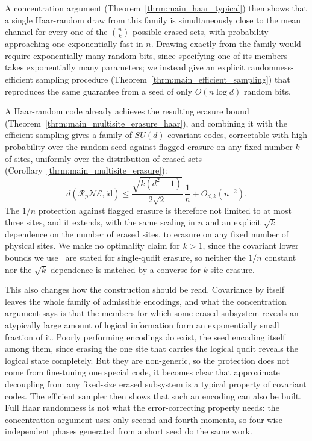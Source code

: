 \documentclass[10pt,twocolumn,superscriptaddress,aps,amsmath,amssymb,citeautoscript,floatfix,prx]{revtex4-2}
\theoremstyle{plain}
\theoremstyle{plain}
\theoremstyle{plain}
\theoremstyle{plain}
\theoremstyle{plain}
\theoremstyle{plain}
\theoremstyle{plain}
\theoremstyle{definition}
\theoremstyle{plain}
\begin{document}
A concentration argument (Theorem~\ref{thrm:main_haar_typical}) then shows that a single Haar-random draw from this family is
simultaneously close to the mean channel for every one of the $\binom nk$ possible erased sets, with probability approaching one exponentially fast in $n$. 
Drawing exactly from the family would require exponentially many random bits, since specifying one of its members takes exponentially many parameters; 
we instead give an explicit randomness-efficient sampling procedure (Theorem~\ref{thrm:main_efficient_sampling}) that reproduces the same guarantee from a seed of only $O(n\log d)$ random bits.

A Haar-random code already achieves the resulting erasure bound (Theorem~\ref{thrm:main_multisite_erasure_haar}), and combining it with the efficient sampling gives 
a family of $SU(d)$-covariant codes, correctable with high probability over the random seed against flagged erasure on any fixed number $k$ of sites, uniformly over the distribution of erased sets 
(Corollary~\ref{thrm:main_multisite_erasure}):
$$
d(\mathcal R_p\mathcal N\mathcal E,\mathrm{id})\le \frac{\sqrt{k(d^2-1)}}{2\sqrt2}\,\frac1n+O_{d,k}(n^{-2}).
$$
The $1/n$ protection against flagged erasure is therefore not limited to at most three sites, and it extends, with the same scaling in $n$ and an explicit $\sqrt k$ dependence on the number of erased sites, to erasure on any fixed number of physical sites. We make no optimality claim for $k>1$, 
since the covariant lower bounds we use~\cite{Faist2020,Zhou2021} are stated for single-qudit erasure, so neither the $1/n$ constant nor the $\sqrt k$ dependence is matched by a converse for $k$-site erasure.

This also changes how the construction should be read. Covariance by itself leaves the whole family of admissible encodings, and what the concentration argument says is that the members for which some erased subsystem reveals an atypically large amount of 
logical information form an exponentially small fraction of it. Poorly performing encodings do exist, the seed encoding itself among them, since erasing the one site that carries the logical qudit reveals the logical state completely. But they are non-generic, so the protection does not come from 
fine-tuning one special code, it becomes clear that approximate decoupling from any fixed-size erased subsystem is a typical property of covariant codes.
The efficient sampler then shows that such an encoding can also be built. Full Haar randomness is not what the error-correcting property needs: the concentration argument uses only second and fourth moments, so four-wise independent phases generated from a short seed do the same work.
\end{document}
